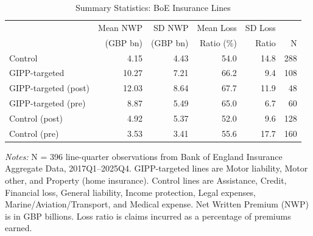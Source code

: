 \begin{table}[H]
\centering
\caption{Summary Statistics: BoE Insurance Lines}
 \label{tab:summary}
 \begin{threeparttable}
 \begin{tabular}{lrrrrr}
\toprule
  & Mean NWP & SD NWP & Mean Loss & SD Loss & \\
  & (GBP bn) & (GBP bn) & Ratio (\%) & Ratio & N \\
\midrule
Control & 4.15 & 4.43 & 54.0 & 14.8 & 288 \\
GIPP-targeted & 10.27 & 7.21 & 66.2 & 9.4 & 108 \\
GIPP-targeted (post) & 12.03 & 8.64 & 67.7 & 11.9 & 48 \\
GIPP-targeted (pre) & 8.87 & 5.49 & 65.0 & 6.7 & 60 \\
Control (post) & 4.92 & 5.37 & 52.0 & 9.6 & 128 \\
Control (pre) & 3.53 & 3.41 & 55.6 & 17.7 & 160 \\
\bottomrule
\end{tabular}
 \begin{tablenotes}[flushleft]
\small
 \item \textit{Notes:} N = 396 line-quarter observations from Bank of England  Insurance Aggregate Data, 2017Q1--2025Q4. GIPP-targeted lines are Motor liability,  Motor other, and Property (home insurance). Control lines are Assistance, Credit,  Financial loss, General liability, Income protection, Legal expenses, Marine/Aviation/Transport,  and Medical expense. Net Written Premium (NWP) is in GBP billions. Loss ratio is claims  incurred as a percentage of premiums earned.
 \end{tablenotes}
\end{threeparttable}
\end{table}
